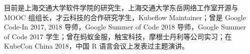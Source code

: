 

\begin{cvparagraph}
\begin{minipage}[t]{\textwidth}
目前是上海交通大学软件学院的研究生，上海交通大学东岳网络工作室开源与 MOOC 组组长，才云科技的合作研究学生，Kubeflow Maintainer；曾是 Google Code-In 2017, 2018 导师，Google Summer of Code 2018 导师，Google Summer of Code 2017 学生；曾在蚂蚁金服，触宝科技，摩根士丹利等公司实习；在 KubeCon China 2018，中国 R 语言会议上发表过主题演讲。
\end{minipage}
\end{cvparagraph}
